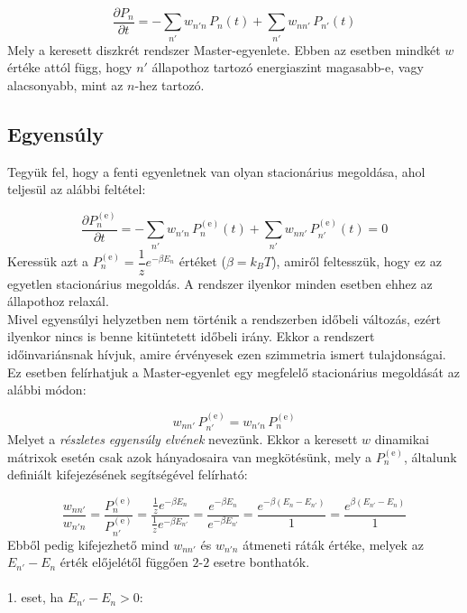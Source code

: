 \begin{equation}
    \boxed{
    \frac{\partial P_{n}}{\partial t}
    =
    -
    \sum_{n'} w_{n'n}\,P_{n} \left( t \right)
    +
    \sum_{n'} w_{nn'}\,P_{n'} \left( t \right)
    }
\end{equation}
Mely a keresett diszkrét rendszer Master-egyenlete. Ebben az esetben mindkét $w$ értéke attól függ, hogy $n'$ állapothoz tartozó energiaszint magasabb-e, vagy alacsonyabb, mint az $n$-hez tartozó.

\subsection{Egyensúly} \label{sub:3.2}
Tegyük fel, hogy a fenti egyenletnek van olyan stacionárius megoldása, ahol teljesül az alábbi feltétel:

\begin{equation}
    \frac{\partial P_{n}^{\left( \text{e} \right)}}{\partial t}
    =
    -
    \sum_{n'} w_{n'n}\,P_{n}^{\left( \text{e} \right)} \left( t \right)
    +
    \sum_{n'} w_{nn'}\,P_{n'}^{\left( \text{e} \right)} \left( t \right)
    =
    0
\end{equation}
Keressük azt a $P_{n}^{\left( \text{e} \right)} = \dfrac{1}{z} e^{- \beta E_{n}}$ értéket ($\beta = k_{B} T$), amiről feltesszük, hogy ez az egyetlen stacionárius megoldás. A rendszer ilyenkor minden esetben ehhez az állapothoz relaxál. \\
Mivel egyensúlyi helyzetben nem történik a rendszerben időbeli változás, ezért ilyenkor nincs is benne kitüntetett időbeli irány. Ekkor a rendszert időinvariánsnak hívjuk, amire érvényesek ezen szimmetria ismert tulajdonságai\cite{hilhorst2011stabilisation}. Ez esetben felírhatjuk a Master-egyenlet egy megfelelő stacionárius megoldását az alábbi módon:

\begin{equation}
    w_{nn'}\,P_{n'}^{\left( \text{e} \right)}
    =
    w_{n'n}\,P_{n}^{\left( \text{e} \right)}
\end{equation}
Melyet a \emph{részletes egyensúly elvének} nevezünk. Ekkor a keresett $w$ dinamikai mátrixok esetén csak azok hányadosaira van megkötésünk, mely a $P_{n}^{\left( \text{e} \right)}$, általunk definiált kifejezésének segítségével felírható:

\begin{equation}
    \frac{w_{nn'}}{w_{n'n}}
    =
    \frac{P_{n}^{\left( \text{e} \right)}}{P_{n'}^{\left( \text{e} \right)}}
    =
    \frac{\frac{1}{z} e^{- \beta E_{n}}}{\frac{1}{z} e^{- \beta E_{n'}}}
    =
    \frac{e^{- \beta E_{n}}}{e^{- \beta E_{n'}}}
    =
    \frac{e^{- \beta \left( E_{n} - E_{n'} \right)}}{1}
    =
    \frac{e^{\beta \left( E_{n'} - E_{n} \right)}}{1}
\end{equation}
Ebből pedig kifejezhető mind $w_{nn'}$ és $w_{n'n}$ átmeneti ráták értéke, melyek az $E_{n'} - E_{n}$ érték előjelétől függően $2$-$2$ esetre bonthatók.
\\ \\
1. eset, ha $E_{n'} - E_{n} > 0$:

